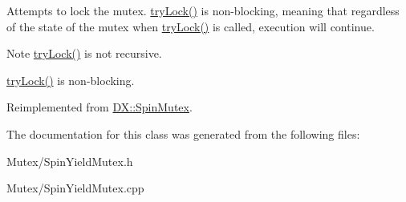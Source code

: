 Attempts to lock the mutex. \hyperlink{class_d_x_1_1_spin_yield_mutex_acd1ed560cf8afd7363a520beff4b5455}{try\-Lock()} is non-\/blocking, meaning that regardless of the state of the mutex when \hyperlink{class_d_x_1_1_spin_yield_mutex_acd1ed560cf8afd7363a520beff4b5455}{try\-Lock()} is called, execution will continue. 

\begin{DoxyNote}{Note}
\hyperlink{class_d_x_1_1_spin_yield_mutex_acd1ed560cf8afd7363a520beff4b5455}{try\-Lock()} is not recursive. 

\hyperlink{class_d_x_1_1_spin_yield_mutex_acd1ed560cf8afd7363a520beff4b5455}{try\-Lock()} is non-\/blocking. 
\end{DoxyNote}


Reimplemented from \hyperlink{class_d_x_1_1_spin_mutex_af1a59657616a8c68ff5785e18e53a469}{D\-X\-::\-Spin\-Mutex}.



The documentation for this class was generated from the following files\-:\begin{DoxyCompactItemize}
\item 
Mutex/Spin\-Yield\-Mutex.\-h\item 
Mutex/Spin\-Yield\-Mutex.\-cpp\end{DoxyCompactItemize}
